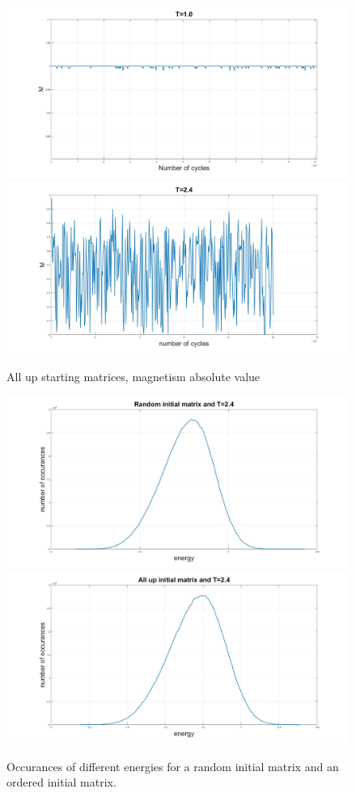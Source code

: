 \documentclass[10pt,a4paper]{article}
\begin{document}
\begin{figure}
\centerline{
\includegraphics[scale=0.15]{UPmag1abs.jpg}
\includegraphics[scale=0.15]{UPmag24abs.jpg}
}
\caption{All up starting matrices, magnetism absolute value}
\label{fig:UpMagnetizm}
\end{figure}


\begin{figure} [H]
\centerline{
\includegraphics[scale=0.15]{OccurancesRandom.jpg}
\includegraphics[scale=0.15]{OccurancesUp.jpg}
}
\caption{Occurances of different energies for a random initial matrix and an ordered initial matrix.}
\label{fig:ProbBoth}
\end{figure}
\end{document}
